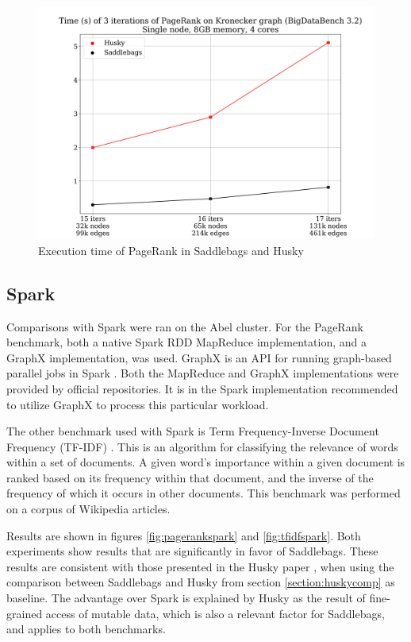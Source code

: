 \documentclass{uit-report}
\begin{document}
\vskip 2cm

\begin{figure}[H]
	\centering
	\includegraphics[width=15cm]{illustrations/png/huskypagerank.png}
	\caption{Execution time of PageRank in Saddlebags and Husky}
	\label{fig:huskypagerank}
\end{figure}



\newpage
\subsection{Spark}\label{section:sparkeval}
Comparisons with Spark were ran on the Abel cluster. For the PageRank benchmark, both a native Spark RDD MapReduce implementation, and a GraphX implementation, was used. GraphX is an API for running graph-based parallel jobs in Spark \cite{graphx}. Both the MapReduce \cite{sparkpagerank} and GraphX \cite{graphxpagerank} implementations were provided by official repositories. It is in the Spark implementation recommended to utilize GraphX to process this particular workload.

The other benchmark used with Spark is Term Frequency-Inverse Document Frequency (TF-IDF) \cite{tfidf}. This is an algorithm for classifying the relevance of words within a set of documents. A given word's importance within a given document is ranked based on its frequency within that document, and the inverse of the frequency of which it occurs in other documents. This benchmark was performed on a corpus of Wikipedia articles.

Results are shown in figures \ref{fig:pagerankspark} and \ref{fig:tfidfspark}. Both experiments show results that are significantly in favor of Saddlebags. These results are consistent with those presented in the Husky paper \cite{husky}, when using the comparison between Saddlebags and Husky from section \ref{section:huskycomp} as baseline. The advantage over Spark is explained by Husky as the result of fine-grained access of mutable data, which is also a relevant factor for Saddlebags, and applies to both benchmarks.
\end{document}
